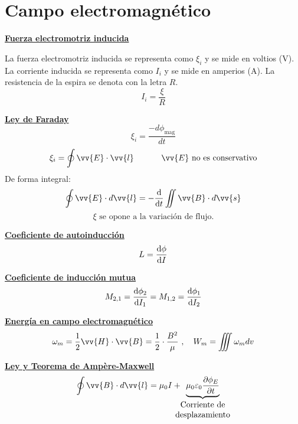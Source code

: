 \documentclass[a4paper]{book}
\numberwithin{figure}{chapter}
\numberwithin{equation}{chapter}
\newcommand{\formula}[1]{\vspace{13 pt}\noindent \textbf{\underline{#1}}}
\newcommand{\subtext}[1]{_{\text{#1}}}
\renewcommand{\vec}[1]{\vv{{#1}}}
\begin{document}
\newpage
\section{Campo electromagnético}
\begin{fleqn}
	\begin{multicols}{2}
		\formula{Fuerza electromotriz inducida}

		\noindent La fuerza electromotriz inducida se representa como $\xi_i$ y se mide en voltios (V). La corriente inducida se representa como $I_i$ y se mide en amperios (A). La resistencia de la espira se denota con la letra $R$.
		\[I_i=\frac{\xi}{R}\]

		\formula{Ley de Faraday}
		\[\xi_i = \frac{-d \phi\subtext{mag}}{dt}\]
		\[\xi_i=\oint{\vec{E}\cdot \vec{l}}\ \qquad \quad \vec{E} \text{ no es conservativo}\]
		\noindent De forma integral:
		\[\oint{\vec{E}\cdot d\vec{l}}=-\dv{}{t}\iint{\vec{B}\cdot d\vec{s}}\]
		\[\xi \text{ se opone a la variación de flujo.}\]

		\formula{Coeficiente de autoinducción}
		\[L=\dv{\phi}{I}\]

		\formula{Coeficiente de inducción mutua}
		\[M_{2,1}=\dv{\phi_2}{I_1}=M_{1,2}=\dv{\phi_1}{I_2}\]

		\formula{Energía en campo electromagnético}
		\[\omega_m = \frac{1}{2}\vec{H}\cdot \vec{B}= \frac{1}{2}\cdot \frac{B^2}{\mu} \ , \quad W_m=\iiint \omega_m dv\]

		\formula{Ley y Teorema de Ampère-Maxwell}
		\[\oint{\vec{B}\cdot d\vec{l}} = \mu _0I+\!\!\!\!\!\underbrace{\mu_0\varepsilon_0\pdv{\phi_E}{t}}_{ \begin{matrix}
					\text{Corriente de} \\
					\text{desplazamiento}
				\end{matrix}}\]

	\end{multicols}
\end{fleqn}

% 
\end{document}
